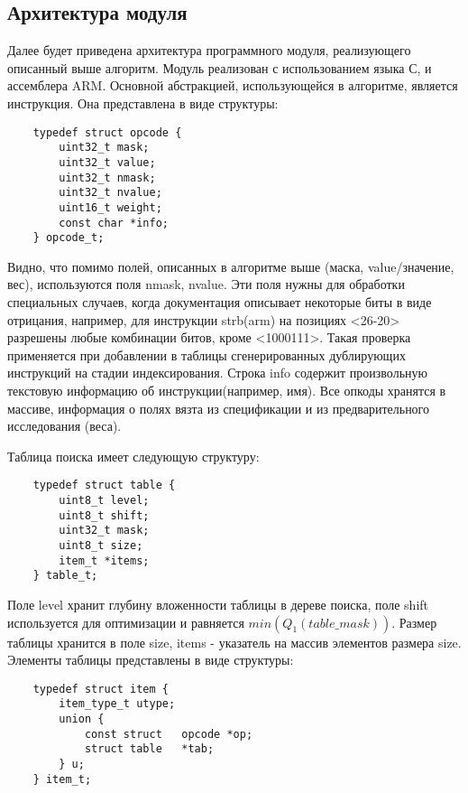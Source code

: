 \subsection{Архитектура модуля}
Далее будет приведена архитектура программного модуля, реализующего описанный выше алгоритм. Модуль реализован с использованием языка С, и ассемблера ARM. Основной абстракцией, использующейся в алгоритме, является инструкция. Она представлена в виде структуры:

\scriptsize
\begin{verbatim}
    typedef struct opcode {
        uint32_t mask;
        uint32_t value;
        uint32_t nmask;
        uint32_t nvalue;
        uint16_t weight;
        const char *info;
    } opcode_t;
\end{verbatim}
\normalsize

Видно, что помимо полей, описанных в алгоритме выше (маска, value/значение, вес), используются поля nmask, nvalue. Эти поля нужны для обработки специальных случаев, когда документация описывает некоторые биты в виде отрицания, например, для инструкции strb(arm) на позициях <26-20> разрешены любые комбинации битов, кроме <1000111>. Такая проверка применяется при добавлении в таблицы сгенерированных дублирующих инструкций на стадии индексирования. Строка info содержит произвольную текстовую информацию об инструкции(например, имя). Все опкоды хранятся в массиве, информация о полях вязта из спецификации и из предварительного исследования (веса).

Таблица поиска имеет следующую структуру:

\scriptsize
\begin{verbatim}
    typedef struct table {
        uint8_t level;
        uint8_t shift;
        uint32_t mask;
        uint8_t size;
        item_t *items;
    } table_t;
\end{verbatim}
\normalsize

Поле level хранит глубину вложенности таблицы в дереве поиска, поле shift используется для оптимизации и равняется $min(Q_1(table\_mask))$. Размер таблицы хранится в поле size, items - указатель на массив элементов размера size. Элементы таблицы представлены в виде структуры:

\scriptsize
\begin{verbatim}
    typedef struct item {
        item_type_t utype;
        union {
            const struct   opcode *op;
            struct table   *tab;
        } u;
    } item_t;
\end{verbatim}
\normalsize
    
